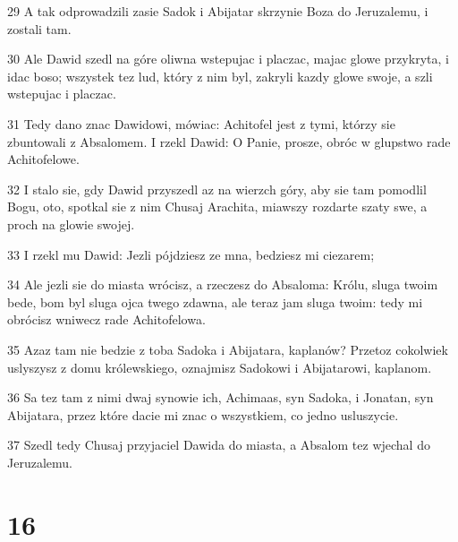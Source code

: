 \par 29 A tak odprowadzili zasie Sadok i Abijatar skrzynie Boza do Jeruzalemu, i zostali tam.
\par 30 Ale Dawid szedl na góre oliwna wstepujac i placzac, majac glowe przykryta, i idac boso; wszystek tez lud, który z nim byl, zakryli kazdy glowe swoje, a szli wstepujac i placzac.
\par 31 Tedy dano znac Dawidowi, mówiac: Achitofel jest z tymi, którzy sie zbuntowali z Absalomem. I rzekl Dawid: O Panie, prosze, obróc w glupstwo rade Achitofelowe.
\par 32 I stalo sie, gdy Dawid przyszedl az na wierzch góry, aby sie tam pomodlil Bogu, oto, spotkal sie z nim Chusaj Arachita, miawszy rozdarte szaty swe, a proch na glowie swojej.
\par 33 I rzekl mu Dawid: Jezli pójdziesz ze mna, bedziesz mi ciezarem;
\par 34 Ale jezli sie do miasta wrócisz, a rzeczesz do Absaloma: Królu, sluga twoim bede, bom byl sluga ojca twego zdawna, ale teraz jam sluga twoim: tedy mi obrócisz wniwecz rade Achitofelowa.
\par 35 Azaz tam nie bedzie z toba Sadoka i Abijatara, kaplanów? Przetoz cokolwiek uslyszysz z domu królewskiego, oznajmisz Sadokowi i Abijatarowi, kaplanom.
\par 36 Sa tez tam z nimi dwaj synowie ich, Achimaas, syn Sadoka, i Jonatan, syn Abijatara, przez które dacie mi znac o wszystkiem, co jedno usluszycie.
\par 37 Szedl tedy Chusaj przyjaciel Dawida do miasta, a Absalom tez wjechal do Jeruzalemu.

\chapter{16}

